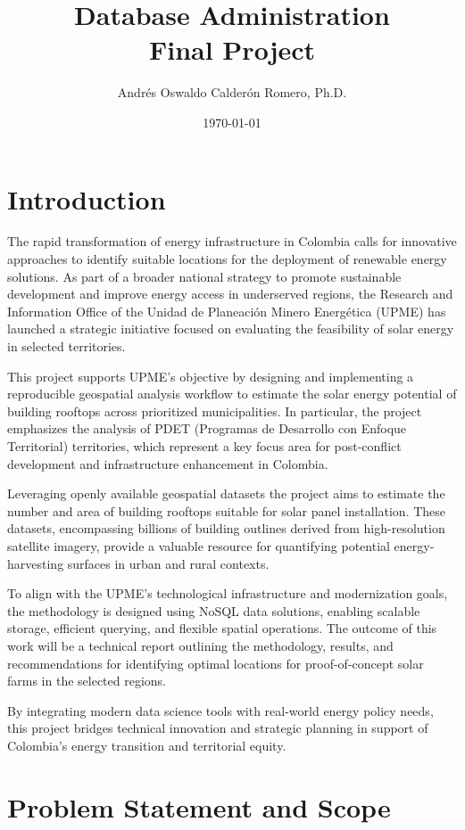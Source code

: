 \documentclass[12pt]{article}
\title{Database Administration \\ Final Project}
\author{Andrés Oswaldo Calderón Romero, Ph.D.}
\date{\today}
\begin{document}
\maketitle

\section{Introduction}

The rapid transformation of energy infrastructure in Colombia calls for innovative approaches to identify suitable locations for the deployment of renewable energy solutions. As part of a broader national strategy to promote sustainable development and improve energy access in underserved regions, the Research and Information Office of the Unidad de Planeación Minero Energética (UPME) has launched a strategic initiative focused on evaluating the feasibility of solar energy in selected territories.

This project supports UPME's objective by designing and implementing a reproducible geospatial analysis workflow to estimate the solar energy potential of building rooftops across prioritized municipalities. In particular, the project emphasizes the analysis of PDET (Programas de Desarrollo con Enfoque Territorial) territories, which represent a key focus area for post-conflict development and infrastructure enhancement in Colombia.

Leveraging openly available geospatial datasets the project aims to estimate the number and area of building rooftops suitable for solar panel installation. These datasets, encompassing billions of building outlines derived from high-resolution satellite imagery, provide a valuable resource for quantifying potential energy-harvesting surfaces in urban and rural contexts.

To align with the UPME's technological infrastructure and modernization goals, the methodology is designed using NoSQL data solutions, enabling scalable storage, efficient querying, and flexible spatial operations. The outcome of this work will be a technical report outlining the methodology, results, and recommendations for identifying optimal locations for proof-of-concept solar farms in the selected regions.

By integrating modern data science tools with real-world energy policy needs, this project bridges technical innovation and strategic planning in support of Colombia's energy transition and territorial equity.

\section{Problem Statement and Scope}
\end{document}
